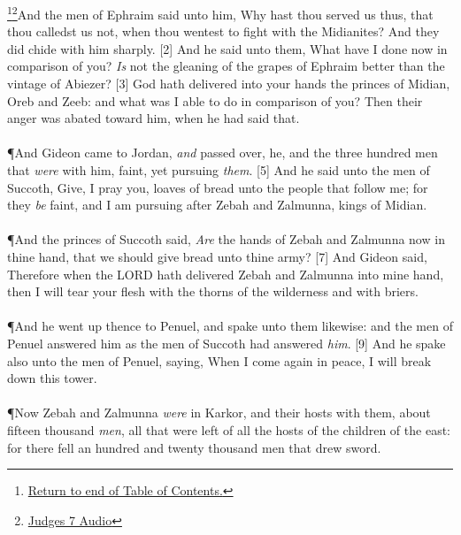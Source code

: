 \footnote{\textcolor[rgb]{0.00,0.25,0.00}{\hyperlink{JudgesTOC}{Return to end of Table of Contents.}}}\footnote{\href{https://audiobible.com/bible/judges_7.html}{\textcolor[cmyk]{0.99998,1,0,0}{Judges 7 Audio}}}\textcolor[cmyk]{0.99998,1,0,0}{And the men of Ephraim said unto him, Why hast thou served us thus, that thou calledst us not, when thou wentest to fight with the Midianites? And they did chide with him sharply.}
[2] \textcolor[cmyk]{0.99998,1,0,0}{And he said unto them, What have I done now in comparison of you? \emph{Is} not the gleaning of the grapes of Ephraim better than the vintage of Abiezer?}
[3] \textcolor[cmyk]{0.99998,1,0,0}{God hath delivered into your hands the princes of Midian, Oreb and Zeeb: and what was I able to do in comparison of you? Then their anger was abated toward him, when he had said that.}\\
\\
\P \textcolor[cmyk]{0.99998,1,0,0}{And Gideon came to Jordan, \emph{and} passed over, he, and the three hundred men that \emph{were} with him, faint, yet pursuing \emph{them}.}
[5] \textcolor[cmyk]{0.99998,1,0,0}{And he said unto the men of Succoth, Give, I pray you, loaves of bread unto the people that follow me; for they \emph{be} faint, and I am pursuing after Zebah and Zalmunna, kings of Midian.}\\
\\
\P \textcolor[cmyk]{0.99998,1,0,0}{And the princes of Succoth said, \emph{Are} the hands of Zebah and Zalmunna now in thine hand, that we should give bread unto thine army?}
[7] \textcolor[cmyk]{0.99998,1,0,0}{And Gideon said, Therefore when the LORD hath delivered Zebah and Zalmunna into mine hand, then I will tear your flesh with the thorns of the wilderness and with briers.}\\
\\
\P \textcolor[cmyk]{0.99998,1,0,0}{And he went up thence to Penuel, and spake unto them likewise: and the men of Penuel answered him as the men of Succoth had answered \emph{him}.}
[9] \textcolor[cmyk]{0.99998,1,0,0}{And he spake also unto the men of Penuel, saying, When I come again in peace, I will break down this tower.}\\
\\
\P \textcolor[cmyk]{0.99998,1,0,0}{Now Zebah and Zalmunna \emph{were} in Karkor, and their hosts with them, about fifteen thousand \emph{men}, all that were left of all the hosts of the children of the east: for there fell an hundred and twenty thousand men that drew sword.}\\
